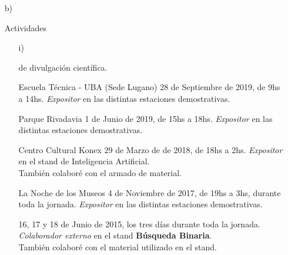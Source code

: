 \begin{enumerate}[leftmargin=0.8cm]
{\begin{itemize}[leftmargin=0.2cm]
{\begin{itemize}[leftmargin=0.2cm]
        \end{itemize}
      }

    \end{itemize}
  }

  \item[b)]{Actividades

    \begin{itemize}[leftmargin=0.2cm]

      \item[i)]{de divulgación científica.

        \begin{itemize}[leftmargin=0.2cm]

          {Escuela Técnica - UBA (Sede Lugano)}
          {28 de Septiembre de 2019, de 9hs a 14hs.}
          {\emph{Expositor} en las distintas estaciones demostrativas.}

          {Parque Rivadavia}
          {1 de Junio de 2019, de 15hs a 18hs.}
          {\emph{Expositor} en las distintas estaciones demostrativas.}

          {Centro Cultural Konex}
          {29 de Marzo de de 2018, de 18hs a 2hs.}
          {\emph{Expositor} en el stand de Inteligencia Artificial. \\
          También colaboré con el armado de material.}

          {La Noche de los Museos}
          {4 de Noviembre de 2017, de 19hs a 3hs, durante toda la jornada.}
          {\emph{Expositor} en las distintas estaciones demostrativas.}

          {}{16, 17 y 18 de Junio de 2015, los tres días durante toda la jornada.}
          {\emph{Colaborador externo} en el stand \textbf{Búsqueda Binaria}. \\
          También colaboré con el material utilizado en el stand.}


\end{itemize}}
\end{itemize}}
\end{enumerate}

